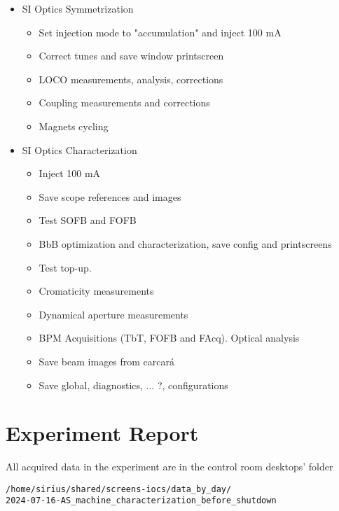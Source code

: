 \documentclass{article}
\newcommand{\pcheckmark}{\checkmark\makebox[0pt][r]{\normalfont\symbol{'26}}}
\begin{document}
\begin{itemize}
\begin{itemize}
\end{itemize}
\item SI Optics Symmetrization
\begin{itemize}
\item Set injection mode to "accumulation" and inject 100 mA
\item Correct tunes and save window printscreen \pcheckmark
\item LOCO measurements, analysis, corrections \checkmark
\item Coupling measurements and corrections
\item Magnets cycling
\end{itemize}
\item SI Optics Characterization
\begin{itemize}
\item Inject 100 mA \checkmark
\item Save scope references and images
\item Test SOFB and FOFB \checkmark
\item BbB optimization and characterization, save config and printscreens
\item Test top-up. \checkmark
\item Cromaticity measurements \checkmark
\item Dynamical aperture measurements
\item BPM Acquisitions (TbT, FOFB and FAcq). Optical analysis \checkmark
\item Save beam images from carcará \checkmark
\item Save global, diagnostics, ... ?, configurations \checkmark
\end{itemize}
\end{itemize}


\section{Experiment Report}

All acquired data in the experiment are in the control room desktops' folder 
\begin{verbatim}
/home/sirius/shared/screens-iocs/data_by_day/
2024-07-16-AS_machine_characterization_before_shutdown
\end{verbatim}
\end{document}

